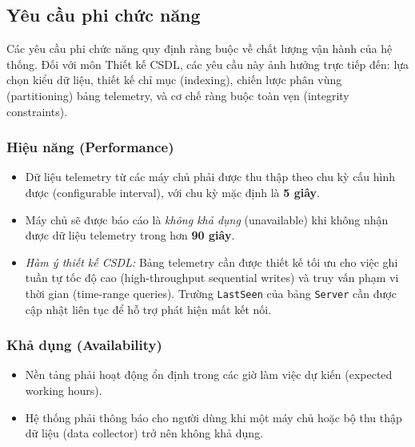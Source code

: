 \subsection{Yêu cầu phi chức năng}
Các yêu cầu phi chức năng quy định ràng buộc về chất lượng vận hành của hệ thống. Đối với môn Thiết kế CSDL, các yêu cầu này ảnh hưởng trực tiếp đến: lựa chọn kiểu dữ liệu, thiết kế chỉ mục (indexing), chiến lược phân vùng (partitioning) bảng telemetry, và cơ chế ràng buộc toàn vẹn (integrity constraints).

\subsubsection{Hiệu năng (Performance)}
\begin{itemize}[leftmargin=2em]
    \item Dữ liệu telemetry từ các máy chủ phải được thu thập theo chu kỳ cấu hình được (configurable interval), với chu kỳ mặc định là \textbf{5 giây}.
    \item Máy chủ sẽ được báo cáo là \textit{không khả dụng} (unavailable) khi không nhận được dữ liệu telemetry trong hơn \textbf{90 giây}.
    \item \textit{Hàm ý thiết kế CSDL:} Bảng telemetry cần được thiết kế tối ưu cho việc ghi tuần tự tốc độ cao (high-throughput sequential writes) và truy vấn phạm vi thời gian (time-range queries). Trường \texttt{LastSeen} của bảng \texttt{Server} cần được cập nhật liên tục để hỗ trợ phát hiện mất kết nối.
\end{itemize}

\subsubsection{Khả dụng (Availability)}
\begin{itemize}[leftmargin=2em]
    \item Nền tảng phải hoạt động ổn định trong các giờ làm việc dự kiến (expected working hours).
    \item Hệ thống phải thông báo cho người dùng khi một máy chủ hoặc bộ thu thập dữ liệu (data collector) trở nên không khả dụng.
\end{itemize}

